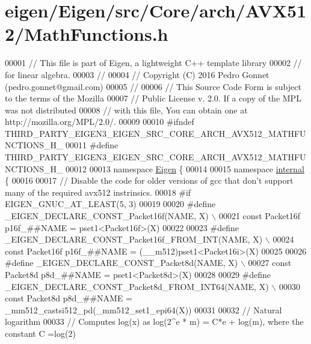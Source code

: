 \hypertarget{eigen_2_eigen_2src_2_core_2arch_2_a_v_x512_2_math_functions_8h_source}{}\section{eigen/\+Eigen/src/\+Core/arch/\+A\+V\+X512/\+Math\+Functions.h}
\label{eigen_2_eigen_2src_2_core_2arch_2_a_v_x512_2_math_functions_8h_source}

\begin{DoxyCode}
00001 \textcolor{comment}{// This file is part of Eigen, a lightweight C++ template library}
00002 \textcolor{comment}{// for linear algebra.}
00003 \textcolor{comment}{//}
00004 \textcolor{comment}{// Copyright (C) 2016 Pedro Gonnet (pedro.gonnet@gmail.com)}
00005 \textcolor{comment}{//}
00006 \textcolor{comment}{// This Source Code Form is subject to the terms of the Mozilla}
00007 \textcolor{comment}{// Public License v. 2.0. If a copy of the MPL was not distributed}
00008 \textcolor{comment}{// with this file, You can obtain one at http://mozilla.org/MPL/2.0/.}
00009 
00010 \textcolor{preprocessor}{#ifndef THIRD\_PARTY\_EIGEN3\_EIGEN\_SRC\_CORE\_ARCH\_AVX512\_MATHFUNCTIONS\_H\_}
00011 \textcolor{preprocessor}{#define THIRD\_PARTY\_EIGEN3\_EIGEN\_SRC\_CORE\_ARCH\_AVX512\_MATHFUNCTIONS\_H\_}
00012 
00013 \textcolor{keyword}{namespace }\hyperlink{namespace_eigen}{Eigen} \{
00014 
00015 \textcolor{keyword}{namespace }\hyperlink{namespaceinternal}{internal} \{
00016 
00017 \textcolor{comment}{// Disable the code for older versions of gcc that don't support many of the required avx512 instrinsics.}
00018 \textcolor{preprocessor}{#if EIGEN\_GNUC\_AT\_LEAST(5, 3)}
00019 
00020 \textcolor{preprocessor}{#define \_EIGEN\_DECLARE\_CONST\_Packet16f(NAME, X) \(\backslash\)}
00021 \textcolor{preprocessor}{  const Packet16f p16f\_##NAME = pset1<Packet16f>(X)}
00022 
00023 \textcolor{preprocessor}{#define \_EIGEN\_DECLARE\_CONST\_Packet16f\_FROM\_INT(NAME, X) \(\backslash\)}
00024 \textcolor{preprocessor}{  const Packet16f p16f\_##NAME = (\_\_m512)pset1<Packet16i>(X)}
00025 
00026 \textcolor{preprocessor}{#define \_EIGEN\_DECLARE\_CONST\_Packet8d(NAME, X) \(\backslash\)}
00027 \textcolor{preprocessor}{  const Packet8d p8d\_##NAME = pset1<Packet8d>(X)}
00028 
00029 \textcolor{preprocessor}{#define \_EIGEN\_DECLARE\_CONST\_Packet8d\_FROM\_INT64(NAME, X) \(\backslash\)}
00030 \textcolor{preprocessor}{  const Packet8d p8d\_##NAME = \_mm512\_castsi512\_pd(\_mm512\_set1\_epi64(X))}
00031 
00032 \textcolor{comment}{// Natural logarithm}
00033 \textcolor{comment}{// Computes log(x) as log(2^e * m) = C*e + log(m), where the constant C =log(2)}

\end{DoxyCode}

